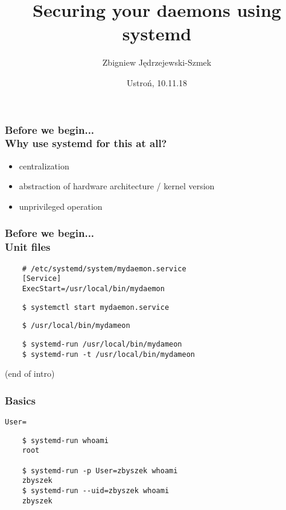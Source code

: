 \documentclass[serif]{beamer}
\title[Systemd security features]{Securing your daemons using systemd}
\author{Zbigniew Jędrzejewski-Szmek}
\institute{%
  \texttt{[image: beamer-themeredhat/redhat.png]}\\
  \medskip
  \textit{zbyszek@in.waw.pl}\\
  \medskip
  \ccbysa
}
\date{\tiny Ustroń, 10.11.18}
\begin{document}
\begin{frame}
\titlepage %
\end{frame}

\begin{frame}
  \frametitle{Before we begin...\\Why use systemd for this at all?}

  \begin{itemize}
  \item centralization
  \item abstraction of hardware architecture / kernel version
  \item unprivileged operation
  \end{itemize}
\end{frame}

\begin{frame}[fragile]
  \frametitle{Before we begin...\\Unit files}

  \pause

  \begin{verbatim}
    # /etc/systemd/system/mydaemon.service
    [Service]
    ExecStart=/usr/local/bin/mydaemon
  \end{verbatim}
  \begin{verbatim}
    $ systemctl start mydaemon.service
  \end{verbatim}

  \medskip
  \pause

  \begin{verbatim}
    $ /usr/local/bin/mydameon
  \end{verbatim}

  \medskip
  \pause

  \begin{verbatim}
    $ systemd-run /usr/local/bin/mydameon
    $ systemd-run -t /usr/local/bin/mydameon
  \end{verbatim}
\end{frame}

\begin{frame}[c]
  \Huge{(end of intro)}
\end{frame}

\begin{frame}[fragile]
  \frametitle{Basics}
  \texttt{User=}

  \medskip
  \pause

  \begin{verbatim}
    $ systemd-run whoami
    root

    $ systemd-run -p User=zbyszek whoami
    zbyszek
    $ systemd-run --uid=zbyszek whoami
    zbyszek
  \end{verbatim}
\end{frame}
\end{document}
